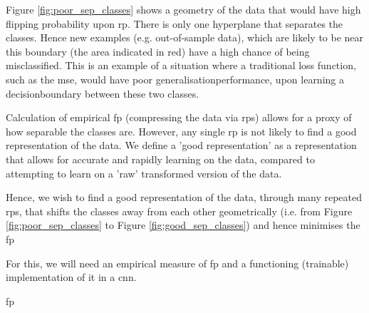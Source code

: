 Figure \ref{fig:poor_sep_classes} shows a geometry of the data that would have high flipping probability upon \gls{rp}. There is only one \gls{hyperplane} that separates the classes. Hence new examples (e.g. out-of-sample data), which are likely to be near this boundary (the area indicated in red) have a high chance of being misclassified. This is an example of a situation where a traditional loss function, such as the \gls{mse}, would have poor \gls{generalisationperformance}, upon learning a \gls{decisionboundary} between these two classes. \bigskip

Calculation of empirical \gls{fp} (compressing the data via \gls{rp}s) allows for a proxy of how separable the classes are. However, any single \gls{rp} is not likely to find a good representation of the data. We define a 'good representation' as a representation that allows for accurate and rapidly learning on the data, compared to attempting to learn on a 'raw' transformed version of the data.


Hence, we wish to find a good representation of the data, through many repeated  \gls{rp}s, that shifts the classes away from each other geometrically (i.e. from Figure \ref{fig:poor_sep_classes} to Figure \ref{fig:good_sep_classes}) and hence minimises the \gls{fp} \bigskip

For this, we will need an empirical measure of \gls{fp} and a functioning (trainable) implementation of it in a \gls{cnn}. \bigskip

\gls{fp}